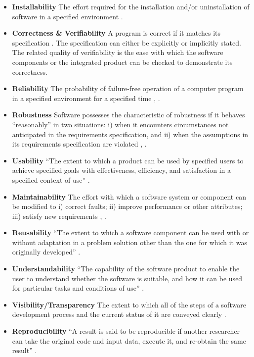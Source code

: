 \documentclass[final, 3p, times, authoryear]{elsarticle}
\begin{document}
\begin{itemize}
	\item \textbf{Installability} The effort required for the installation
    and/or uninstallation of software in a specified environment
    \citep{ISO/IEC25010, lenhard2013measuring}.

	\item \textbf{Correctness \& Verifiability} A program is correct if it
    matches its specification \citep[p.\ 17]{GhezziEtAl2003}.  The specification
    can either be explicitly or implicitly stated.  The related quality of
    verifiability is the ease with which the software components or the
    integrated product can be checked to demonstrate its correctness. 

	\item \textbf{Reliability} The probability of failure-free operation of a
	computer program in a specified environment for a specified time \citep{musa1987software}, \citep[p.\ 357]{GhezziEtAl2003}.

	\item \textbf{Robustness} Software possesses the characteristic of
	robustness if it behaves ``reasonably'' in two situations: i) when it
	encounters circumstances not anticipated in the requirements specification,
	and ii) when the assumptions in its requirements specification are violated
	\citep[p.\ 19]{GhezziEtAl2003}, \citep{boehm2007software}.

	\item \textbf{Usability} ``The extent to which a product can be used by
	specified users to achieve specified goals with effectiveness, efficiency,
	and satisfaction in a specified context of use'' \citep{ISO/TR16982:2002}
	\citep{ISO9241-11:2018}.

	\item \textbf{Maintainability} The effort with which a software system or
	component can be modified to i) correct faults; ii) improve performance or
	other attributes; iii) satisfy new requirements
	\citep{IEEEStdGlossarySET1990}, \citep{boehm2007software}.

	\item \textbf{Reusability} ``The extent to which a software component can be
	used with or without adaptation in a problem solution other than the one for
	which it was originally developed'' \citep{kalagiakos2003non}.

	\item \textbf{Understandability} ``The capability of the software product to
	enable the user to understand whether the software is suitable, and how it
	can be used for particular tasks and conditions of use'' \citep{iso2001iec}.

	\item \textbf{Visibility/Transparency} The extent to which all of the steps
	of a software development process and the current status of it are conveyed
	clearly \citep[p.\ 32]{GhezziEtAl2003}.

	\item \textbf{Reproducibility} ``A result is said to be reproducible if
	another researcher can take the original code and input data, execute it,
	and re-obtain the same result'' \citep{BenureauAndRougier2017}.
\end{itemize}
\end{document}
